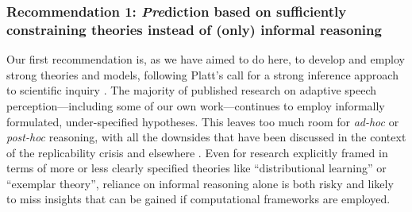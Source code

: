 \documentclass[
  11pt,
  man,floatsintext]{apa6}
\begin{document}
\hypertarget{recommendation-1-prediction-based-on-sufficiently-constraining-theories-instead-of-only-informal-reasoning}{%
\subsubsection{\texorpdfstring{Recommendation 1: \emph{Pre}diction based on sufficiently constraining theories instead of (only) informal reasoning}{Recommendation 1: Prediction based on sufficiently constraining theories instead of (only) informal reasoning}}\label{recommendation-1-prediction-based-on-sufficiently-constraining-theories-instead-of-only-informal-reasoning}}

Our first recommendation is, as we have aimed to do here, to develop and employ strong theories and models, following Platt's call for a strong inference approach to scientific inquiry \autocite{platt1964}. The majority of published research on adaptive speech perception---including some of our own work---continues to employ informally formulated, under-specified hypotheses. This leaves too much room for \emph{ad-hoc} or \emph{post-hoc} reasoning, with all the downsides that have been discussed in the context of the replicability crisis and elsewhere \autocites[e.g.,][]{guest-martin2021,starns2019,vasishth2021,yarkoni2022}. Even for research explicitly framed in terms of more or less clearly specified theories like ``distributional learning'' or ``exemplar theory'', reliance on informal reasoning alone is both risky and likely to miss insights that can be gained if computational frameworks are employed.
\end{document}
